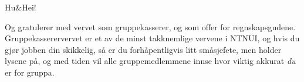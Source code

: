 Hu\&Hei!

Og gratulerer med vervet som gruppekasserer, og som offer for regnskapsgudene. \\
Gruppekasserervervet er et av de minst takknemlige vervene i NTNUI, og hvis du gjør jobben din skikkelig, så er du forhåpentligvis litt småsjefete, men holder lysene på, og med tiden vil alle gruppemedlemmene innse hvor viktig akkurat \emph{du} er for gruppa.
